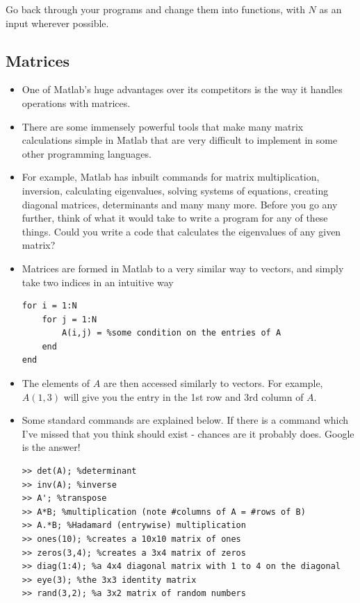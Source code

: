 \documentclass[12pt]{report}
\begin{document}
\begin{tcolorbox}[title=Task]
  Go back through your programs and change them into functions, with $N$ as an input wherever possible.
\end{tcolorbox}

\subsection*{Matrices}

\begin{itemize}
\item One of Matlab's huge advantages over its competitors is the way it handles operations with matrices. 
\item There are some immensely powerful tools that make many matrix calculations simple in Matlab that are very difficult to implement in some other programming languages. 
\item For example, Matlab has inbuilt commands for matrix multiplication, inversion, calculating eigenvalues, solving systems of equations, creating diagonal matrices, determinants and many many more. Before you go any further, think of what it would take to write a program for any of these things. Could you write a code that calculates the eigenvalues of any given matrix?
\item Matrices are formed in Matlab to a very similar way to vectors, and simply take two indices in an intuitive way
\begin{lstlisting}
for i = 1:N
	for j = 1:N
		A(i,j) = %some condition on the entries of A
	end
end
\end{lstlisting}
\item The elements of $A$ are then accessed similarly to vectors. For example, $A(1,3)$ will give you the entry in the 1st row and 3rd column of $A$.
\item Some standard commands are explained below. If there is a command which I've missed that you think should exist - chances are it probably does. Google is the answer!
\begin{lstlisting}
>> det(A); %determinant
>> inv(A); %inverse
>> A'; %transpose
>> A*B; %multiplication (note #columns of A = #rows of B)
>> A.*B; %Hadamard (entrywise) multiplication
>> ones(10); %creates a 10x10 matrix of ones
>> zeros(3,4); %creates a 3x4 matrix of zeros
>> diag(1:4); %a 4x4 diagonal matrix with 1 to 4 on the diagonal
>> eye(3); %the 3x3 identity matrix 
>> rand(3,2); %a 3x2 matrix of random numbers
\end{lstlisting}
\end{itemize}
\end{document}
